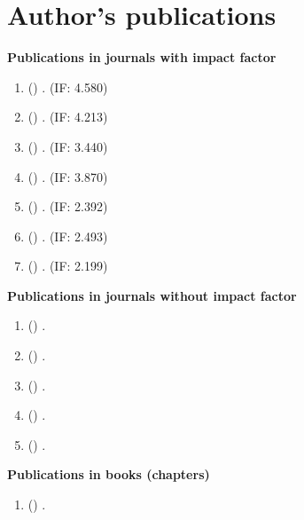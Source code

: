 \chapter*{Author's publications}
{}

\textbf{Publications in journals with impact factor}

\vspace{1em}

\begin{enumerate}
\footnotesize
	\item (\cite{Gomez2018}) . (IF: 4{.}580)
	\item (\cite{Harar2018}) . (IF: 4{.}213)
	\item (\cite{Mekyska2018}) . (IF: 3{.}440)
	\item (\cite{Gomez2017b}) . (IF: 3{.}870)
	\item (\cite{Brabenec2017}) . (IF: 2{.}392)
	\item (\cite{Mekyska2017}) . (IF: 2{.}493)
	\item (\cite{Galaz2016}) . (IF: 2{.}199)
\end{enumerate}

\vspace{1em}

\noindent
\textbf{Publications in journals without impact factor}

\vspace{1em}

\begin{enumerate}
\footnotesize
	\item (\cite{Galaz2017e}) .
	\item (\cite{Galaz2017c}) .
	\item (\cite{Mucha2017a}) .
	\item (\cite{Galaz2016a}) .
	\item (\cite{Galaz2014}) .
\end{enumerate}

\newpage

\noindent
\textbf{Publications in books (chapters)}

\vspace{1em}

\begin{enumerate}
\footnotesize
	\item (\cite{Smekal2015b}) .
\end{enumerate}

